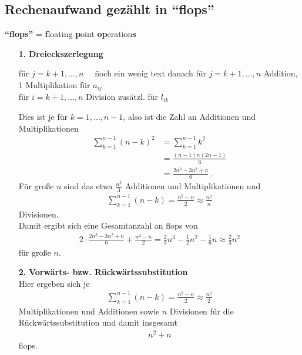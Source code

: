 \documentclass[ngerman,fontsize=11pt, paper=a4, parskip=half, titlepage=true, toc=bib]{scrbook}
\begin{document}
\subsection{Rechenaufwand gezählt in \enquote{flops}} 
\textbf{\enquote{flops} }= \textbf{f}loating \textbf{p}oint \textbf{op}eration\textbf{s} \\
\begin{enumerate}
\item[\textbf{1.}] \textbf{Dreieckszerlegung} 
  \begin{tabbing}
    für $j=k+1, \dots, n\quad$ \= noch ein wenig text danach \kill
    für $j=k+1, \dots, n$  Addition, 1 Multiplikation für $a_{ij}$ \\
    für $i=k+1, \dots, n$  Division zusätzl. für $ l_{ik}$
  \end{tabbing}
  Dies ist je für $k=1, \dots, n-1$, also ist die Zahl an Additionen und Multiplikationen
  \begin{align*}
    \sum_{k=1}^{n-1}(n-k)^2 &= \sum_{k=1}^{n-1}k^2 \\
                            &= \frac{(n-1)n(2n-1)}{6} \\
                            &= \frac{2n^3-3n^2+n}{6}\, .
  \end{align*}
  Für große $n$ sind das etwa $\frac{n^3}{3}$ Additionen und Multiplikationen und
  \begin{gather*}
    \sum_{k=1}^{n-1} (n-k) = \frac{n^2-n}{2} \approx \frac{n^2}{n}
  \end{gather*}
  Divisionen. \\
  Damit ergibt sich eine Gesamtanzahl an flops von
  \begin{gather*}
    2\cdot\frac{2n^3-3n^2+n}{6} + \frac{n^2-n}{2} 
    = \frac{2}{3} n^3 - \frac{1}{2}n^2 - \frac{1}{6} n
    \approx \frac{2}{3}n^2
  \end{gather*}
  für große $n$.
  
\item[\textbf{2.}] \textbf{Vorwärts- bzw. Rückwärtssubstitution}  \\
  Hier ergeben sich je
  \begin{gather*}
    \sum_{k=1}^{n-1} (n-k) = \frac{n^2-n}{2} \approx \frac{n^2}{2}
  \end{gather*}
  Multiplikationen und Additionen sowie 
  $n$ Divisionen für die Rückwärtssubstitution und damit insgesamt \begin{gather*}n^2+n\end{gather*} flops.	
\end{enumerate}
\end{document}
